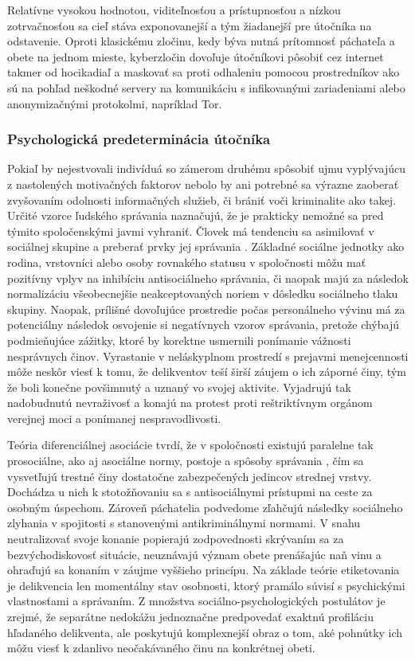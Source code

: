 \documentclass[12pt, a4paper]{article}
\begin{document}
Relatívne vysokou hodnotou, viditeľnosťou a prístupnosťou a nízkou zotrvačnosťou sa cieľ stáva 
exponovanejší a tým žiadanejší pre útočníka na odstavenie. Oproti klasickému zločinu, kedy býva nutná 
prítomnosť páchateľa a obete na jednom mieste, kyberzločin dovoľuje útočníkovi pôsobiť cez internet takmer 
od hocikadiaľ a maskovať sa proti odhaleniu pomocou prostredníkov ako sú na pohľad neškodné servery na 
komunikáciu s infikovanými zariadeniami alebo anonymizačnými protokolmi, napríklad Tor.

\subsubsection{Psychologická predeterminácia útočníka}
Pokiaľ by nejestvovali indivíduá so zámerom druhému spôsobiť ujmu vyplývajúcu z nastolených motivačných
faktorov nebolo by ani potrebné sa výrazne zaoberať zvyšovaním odolnosti informačných služieb, či brániť
voči kriminalite ako takej. Určité vzorce ľudského správania naznačujú, že je prakticky nemožné sa pred 
týmito spoločenskými javmi vyhraniť. Človek má tendenciu sa asimilovať v sociálnej skupine a preberať prvky 
jej správania \cite{heretik}. Základné sociálne jednotky ako rodina, vrstovníci alebo osoby rovnakého
statusu v spoločnosti môžu mať pozitívny vplyv na inhibíciu antisociálneho správania, či naopak majú
za následok normalizáciu všeobecnejšie neakceptovaných noriem v dôsledku sociálneho tlaku skupiny.
Naopak, prílišné dovoľujúce prostredie počas personálneho vývinu má za potenciálny následok osvojenie si 
negatívnych vzorov správania, pretože chýbajú podmieňujúce zážitky, ktoré by korektne usmernili ponímanie 
vážnosti nesprávnych činov. Vyrastanie v neláskyplnom prostredí s prejavmi menejcennosti môže 
neskôr viesť k tomu, že delikventov teší širší záujem o ich záporné činy, tým že boli konečne povšimnutý a 
uznaný vo svojej aktivite. Vyjadrujú tak nadobudnutú nevraživosť a konajú na protest proti 
reštriktívnym orgánom verejnej moci a ponímanej nespravodlivosti.

Teória diferenciálnej asociácie tvrdí, že v spoločnosti existujú paralelne tak 
prosociálne, ako aj asociálne normy, postoje a spôsoby správania \cite{heretik}, čím sa vysvetľujú 
trestné činy dostatočne zabezpečených jedincov strednej vrstvy. Dochádza u nich k stotožňovaniu sa s 
antisociálnymi prístupmi na ceste za osobným úspechom. Zároveň páchatelia podvedome zľahčujú následky 
sociálneho zlyhania v spojitosti s stanovenými antikriminálnymi normami. V snahu neutralizovať svoje
konanie popierajú zodpovednosti skrývaním sa za bezvýchodiskovosť situácie, neuznávajú význam obete 
prenášajúc naň vinu a ohraďujú sa konaním v záujme vyššieho princípu. Na základe teórie etiketovania
je delikvencia len momentálny stav osobnosti, ktorý pramálo súvisí s psychickými vlastnosťami a správaním.
Z množstva sociálno-psychologických postulátov je zrejmé, že separátne nedokážu jednoznačne predpovedať 
exaktnú profiláciu hľadaného delikventa, ale poskytujú komplexnejší obraz o tom, aké pohnútky ich môžu viesť
k zdanlivo neočakávaného činu na konkrétnej obeti.
\end{document}
